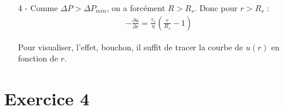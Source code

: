 \documentclass{report}
\begin{document}
\begin{itemize}
\noindent{}
	
	\item[4 - ] Comme $\Delta P > \Delta P_{min}$, on a forcément $R>R_s$. Donc pour $r>R_s$ :
	\begin{align*}
		-\frac{\partial u}{\partial r}=\frac{\tau_s}{\eta}\left( \frac{r}{R_s} - 1\right) 
	\end{align*}
	
\noindent{}
	Pour visualiser, l'effet, bouchon, il suffit de tracer la courbe de $u(r)$ en fonction de $r$. 
	
\end{itemize}

\newpage

\section*{Exercice 4}
\end{document}
